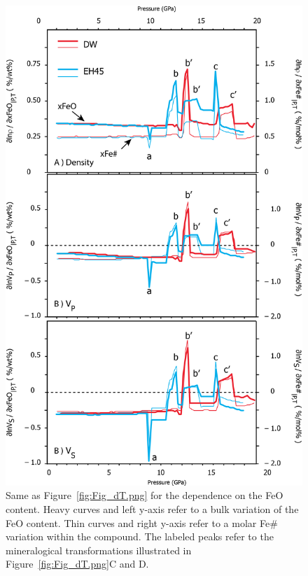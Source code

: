 \newpage
\begin{figure}[!h]
\begin{center}
\includegraphics[width=1.0\textwidth]
{figures/Fig_dFeO.png}
\caption{Same as Figure~\ref{fig:Fig_dT.png} for the dependence on the FeO content. Heavy curves and left y-axis refer to a bulk variation of the FeO content. Thin curves and right y-axis refer to a molar Fe\# variation within the  compound. The labeled peaks refer to the mineralogical transformations illustrated in Figure~\ref{fig:Fig_dT.png}C and D.}
\label{fig:Fig_dFeO.png} 
\end{center}
\end{figure}
